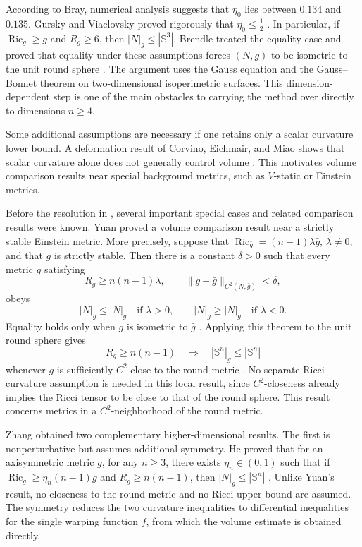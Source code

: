 \documentclass[11pt, reqno]{amsart}
\begin{document}
According to Bray, numerical analysis suggests that $\eta_0$ lies between $0.134$ and $0.135$. Gursky and Viaclovsky proved rigorously that $\eta_0\le \frac12$ \cite[Section~4.1]{GurskyViaclovsky}. In particular, if $\operatorname{Ric}_g\ge g$ and $R_g\ge 6$, then $|N|_g\le |\mathbb S^3|$.
Brendle treated the equality case and proved that equality under these assumptions forces $(N, g)$ to be isometric to the unit round sphere \cite[Theorem~5.6]{BrendleRigidity}. The argument uses the Gauss equation and the Gauss--Bonnet theorem on two-dimensional isoperimetric surfaces. This dimension-dependent step is one of the main obstacles to carrying the method over directly to dimensions $n\ge 4$.

Some additional assumptions are necessary if one retains only a scalar curvature lower bound. A deformation result of Corvino, Eichmair, and Miao shows that scalar curvature alone does not generally control volume \cite{CorvinoEichmairMiao}. This motivates volume comparison results near special background metrics, such as $V$-static or Einstein metrics.

Before the resolution in \cite{JiangLiWang}, several important special cases and related comparison results were known.
Yuan \cite{Yuan} proved a volume comparison result near a strictly stable Einstein metric. More precisely, suppose that $\operatorname{Ric}_{\bar g}=(n-1)\lambda\bar g$, $\lambda\ne 0$, and that $\bar g$ is strictly stable. Then there is a constant $\delta>0$ such that every metric $g$ satisfying
$$
R_g\ge n(n-1)\lambda,
\qquad
\|g-\bar g\|_{C^2(N, \bar g)}<\delta,
$$
obeys
$$
|N|_g\le |N|_{\bar g}\quad\text{if }\lambda>0,
\qquad
|N|_g\ge |N|_{\bar g}\quad\text{if }\lambda<0.
$$
Equality holds only when $g$ is isometric to $\bar g$ \cite[Theorem~B]{Yuan}. Applying this theorem to the unit round sphere gives
$$
R_g\ge n(n-1)
\quad\Longrightarrow\quad
|\mathbb S^n|_g\le |\mathbb S^n|
$$
whenever $g$ is sufficiently $C^2$-close to the round metric \cite[Corollary~B]{Yuan}. No separate Ricci curvature assumption is needed in this local result, since $C^2$-closeness already implies the Ricci tensor to be close to that of the round sphere. This result concerns metrics in a $C^2$-neighborhood of the round metric.

Zhang \cite{Zhang} obtained two complementary higher-dimensional results. The first is nonperturbative but assumes additional symmetry. He proved that for an axisymmetric metric $g$, for any $n\ge 3$, there exists $\eta_n\in(0, 1)$ such that if $\operatorname{Ric}_g\ge \eta_n(n-1)g$ and $R_g\ge n(n-1)$, then $|N|_g\le |\mathbb S^n|$ \cite[Theorem~3]{Zhang}. Unlike Yuan's result, no closeness to the round metric and no Ricci upper bound are assumed. The symmetry reduces the two curvature inequalities to differential inequalities for the single warping function $f$, from which the volume estimate is obtained directly.
\end{document}
